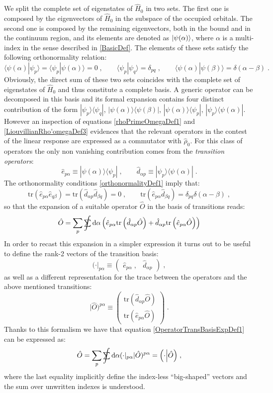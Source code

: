 \documentclass[a4paper]{article}
\newcommand{\dd}{{\rm d}}
\newcommand{\sint}{\mathrlap{\displaystyle\int}
\mathrlap{\textstyle\sum}
\phantom{\mathrlap{\displaystyle
\int}\textstyle\sum}}
\newcommand{\be}{\begin{equation}}
\newcommand{\ee}{\end{equation}}
\newcommand{\qq}{\qquad}
\newcommand{\lb}{\label}
\newcommand{\mat}[1]{\begin{pmatrix} #1\end{pmatrix}}
\newcommand{\op}[1]{\hat {#1}}
\newcommand{\trace}[1]{\mathrm{tr}\left(#1\right)}
\newcommand{\brket}[2]{\langle  #1 | #2 \rangle} %
\newcommand{\ketbra}[2]{| #1 \rangle \langle #2 |}
\newcommand{\sket}[2]{| #2)^{#1}}
\newcommand{\sbra}[2]{( #2|_{#1}}
\newcommand{\dbraket}[2]{\Bigl(#1 \Bigl| #2 \Bigr)}
\newcommand{\dmnot}{\op{\rho}_0}
\newcommand{\hnot}{\op{H}_0}
\newcommand{\excite}[2]{\op e_{{#1}{#2}}}
\newcommand{\decay}[2]{\op d_{{#1}{#2}}}
\begin{document}
We split the complete
set of eigenstates of $\hnot$ in two sets. The first one is composed by the eigenvectors of $\hnot$ in the subspace of the occupied orbitals. The second 
one is composed by the remaining eigenvectors, both in the bound and in the continuum region, and its elements are denoted as $\ket{\psi(\alpha)}$, where $\alpha$ 
is a multi-index in the sense described in \ref{BasicDef}. The elements of these sets satisfy the following orthonormality relation: 
\be\lb{orthonormalityDef1}
\brket{\psi(\alpha)}{\psi_p} = \brket{\psi_p}{\psi(\alpha)} = 0 \;, \qq \brket{\psi_p}{\psi_q} = \delta_{pq} \;, \qq
\brket{\psi(\alpha)}{\psi(\beta)} = \delta(\alpha-\beta) \;.
\ee
Obviously, the direct sum of these two sets coincides with the complete set of eigenstates of $\hnot$ and thus 
constitute a complete basis. 
A generic operator can be decomposed in this basis and its formal expansion contains four distinct contribution of the form $\ketbra{\psi_p}{\psi_q}$, 
$\ketbra{\psi(\alpha)}{\psi(\beta)}$, $\ketbra{\psi(\alpha)}{\psi_p}$, $\ketbra{\psi_p}{\psi(\alpha)}$. However an inspection of equations \eqref{rhoPrimeOmegaDef1}
and \eqref{LiouvillianRho'omegaDef3} evidences that the relevant operators in the contest of the linear response are expressed as a commutator with $\dmnot$. 
For this class of operators the only non vanishing contribution comes from the \emph{transition operators}:
\be
\excite{p}{\alpha} \equiv \ketbra{\psi(\alpha)}{\psi_p}\;, \qq
\decay{\alpha}{p} \equiv \ketbra{\psi_p}{\psi(\alpha)} \;.
\ee
The orthonormality conditions \eqref{orthonormalityDef1} imply that:
\be\lb{transitionOpOrthonormalityDef1}
\trace{\excite{p}{\alpha}\excite{q}{\beta}} = \trace{\decay{\alpha}{p}\decay{\beta}{q}} = 0 \;, \qq
\trace{\excite{p}{\alpha}\decay{\beta}{q}} = \delta_{pq}\delta(\alpha-\beta) \;,
\ee
so that the expansion of a suitable operator $\op O$ in the basis of transitions reads:
\be\lb{OperatorTransBasisExpDef1}
\op O = \sum_p\sint \dd \alpha\left(
\excite{p}{\alpha}\trace{\decay{\alpha}{p}\op O} + \decay{\alpha}{p}\trace{\excite{p}{\alpha}\op O}
\right)
\ee
In order to recast this expansion in a simpler expression it turns out to be useful to define the rank-2 vectors of the transition basis: 
\be
\sbra{p\alpha}{\cdot} \equiv 
\mat{ \excite{p}{\alpha} \;, & \decay{\alpha}{p} }\;,
\ee
as well as a different representation for the trace between the operators and the above mentioned transitions:
\be\lb{OperatorTransitionCoeffDef1}
\sket{p\alpha}{\op O}  \equiv \mat{ \trace{\decay{\alpha}{p}\op O } \\ 
\trace{\excite{p}{\alpha}\op O}} \; .
\ee
Thanks to this formalism we have that equation \eqref{OperatorTransBasisExpDef1} can be expressed as:
\be\lb{OperatorTransBasisExpDef2}
\op O = \sum_p\sint \dd \alpha \sbra{p\alpha}{\cdot}\sket{p\alpha}{\op O} = 
\dbraket{\cdot}{\op O} \;,
\ee
where the last equality implicitly define the index-less ``big-shaped'' vectors and the sum over unwritten indexes is understood.  
\end{document}

